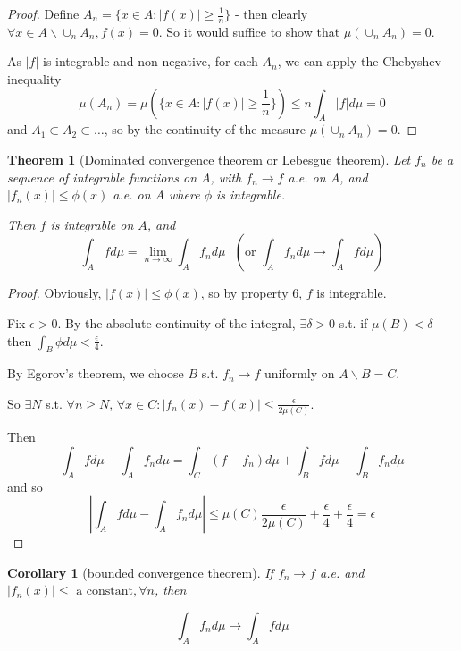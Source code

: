 \documentclass[11pt,a4paper]{report}
\newtheorem{corollary}[theorem]{Corollary}
\theoremstyle{plain}
\newtheorem{thm}{Theorem}[section]
\theoremstyle{definition}
\theoremstyle{remark}
\newcommand{\union}{\cup}
\newcommand{\abs}[1]{\left| #1 \right|}
\begin{document}
\begin{proof}
    Define $A_n = \{ x \in A : \abs{f(x)} \ge \frac{1}{n} \}$ - then clearly $\forall x \in A \backslash \union_n A_n, f(x) = 0$. So it would suffice to show that $\mu(\union_n A_n) = 0$. 
    
    As $\abs{f}$ is integrable and non-negative, for each $A_n$, we can apply the Chebyshev inequality
    $$ \mu(A_n) = \mu(\{x \in A : \abs{f(x)} \ge \frac{1}{n}\}) \le n \int_A \abs{f}d\mu = 0 $$
    and $A_1 \subset A_2 \subset \dots$, so by the continuity of the measure $\mu(\union_n A_n) = 0$.
\end{proof}

\begin{thm}[Dominated convergence theorem or Lebesgue theorem]
    Let $f_n$ be a sequence of integrable functions on $A$, with $f_n \rightarrow f$ a.e. on $A$, and $\abs{f_n(x)} \le \phi(x)$ a.e. on $A$ where $\phi$ is integrable.

    Then $f$ is integrable on $A$, and 
    $$\int_A f d\mu = \lim_{n \rightarrow \infty} \int_A f_n d\mu \text{ } \left(\text{or $\int_A f_n d\mu \rightarrow \int_A f d\mu$} \right)$$
\end{thm}

\begin{proof}
    Obviously, $\abs{f(x)} \le \phi(x)$, so by property 6, $f$ is integrable.

    Fix $\epsilon > 0$. By the absolute continuity of the integral, $\exists \delta > 0$ s.t. if $\mu(B) < \delta$ then $\int_B \phi d\mu < \frac{\epsilon}{4}$.

    By Egorov's theorem, we choose $B$ s.t. $f_n \rightarrow f$ uniformly on $A \backslash B = C$.

    So $\exists N$ s.t. $\forall n \ge N$, $\forall x \in C: \abs{f_n(x) - f(x)} \le \frac{\epsilon}{2\mu(C)}$.

    Then 
    $$ \int_A f d\mu - \int_A f_n d\mu = \int_C (f - f_n) d\mu + \int_B f d\mu - \int_B f_n d\mu$$
    and so
    $$ \abs{\int_A f d\mu - \int_A f_n d\mu} \le \mu(C)\frac{\epsilon}{2\mu(C)} + \frac{\epsilon}{4} + \frac{\epsilon}{4} = \epsilon $$
\end{proof}


\begin{corollary}[bounded convergence theorem]

    If $f_n \rightarrow f$ a.e. and $\abs{f_n(x)} \le \text{ a constant}, \forall n$, then

    $$ \int_A f_n d\mu \rightarrow \int_A f d\mu $$
\end{corollary}
\end{document}
